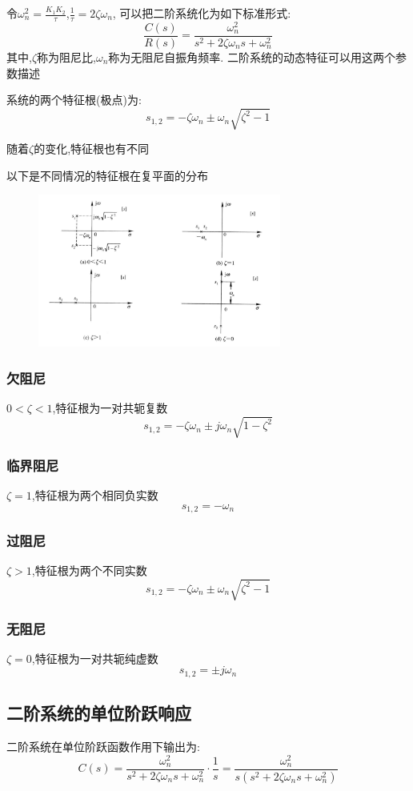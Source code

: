 \documentclass[12pt,a4paper,oneside]{ctexart}
\begin{document}
令$\omega_n^2=\frac{K_1K_2}{\tau}$,$\frac{1}{\tau}=2\zeta \omega_n$,
可以把二阶系统化为如下标准形式:
\[
    \frac{C(s)}{R(s)}=\frac{\omega_n^2}{s^2+2\zeta \omega_n s+\omega_n^2}
\]
其中,$\zeta$称为阻尼比,$\omega_n$称为无阻尼自振角频率.
二阶系统的动态特征可以用这两个参数描述

系统的两个特征根(极点)为:
\[
    s_{1,2}=-\zeta \omega_n \pm \omega_n\sqrt{\zeta^2-1}
\]

随着$\zeta$的变化,特征根也有不同

以下是不同情况的特征根在复平面的分布
\begin{figure}[H]
    \centering
    \includegraphics[width=8cm]{photos/二阶系统极点分布图.png}
\end{figure}

\subsubsection{欠阻尼}
$0<\zeta<1$,特征根为一对共轭复数
\[
    s_{1,2}=-\zeta \omega_n \pm j\omega_n\sqrt{1-\zeta^2}
\]

\subsubsection{临界阻尼}
$\zeta=1$,特征根为两个相同负实数
\[
    s_{1,2}=-\omega_n
\]

\subsubsection{过阻尼}
$\zeta>1$,特征根为两个不同实数
\[
    s_{1,2}=-\zeta \omega_n \pm \omega_n\sqrt{\zeta^2-1}
\]

\subsubsection{无阻尼}
$\zeta=0$,特征根为一对共轭纯虚数
\[
    s_{1,2}=\pm j\omega_n
\]
\subsection{二阶系统的单位阶跃响应}
二阶系统在单位阶跃函数作用下输出为:
\[
    C(s)=\frac{\omega_n^2}{s^2+2\zeta \omega_n s+\omega_n^2}\cdot \frac{1}{s}=\frac{\omega_n^2}{s(s^2+2\zeta \omega_n s+\omega_n^2)}
\]
\end{document}
